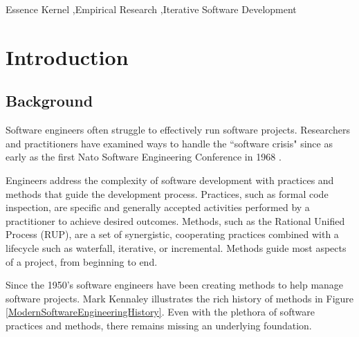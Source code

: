 \documentclass[preprint,12pt,3p]{elsarticle}
\begin{document}
\begin{frontmatter}
\begin{abstract}

\end{abstract}

\begin{keyword}
Essence Kernel \sep Empirical Research \sep Iterative Software Development
\end{keyword}

\end{frontmatter}


\section{Introduction}

\subsection{Background}
Software engineers often struggle to effectively run software projects. Researchers and practitioners have examined ways to handle the ``software crisis" since as early as the first Nato Software Engineering Conference in 1968 \cite{Naur1969}. 

Engineers address the complexity of software development with practices and methods that guide the development process. Practices, such as formal code inspection, are specific and generally accepted activities performed by a practitioner to achieve desired outcomes. Methods, such as the Rational Unified Process (RUP), are a set of synergistic, cooperating practices combined with a lifecycle such as waterfall, iterative, or incremental. Methods guide most aspects of a project, from beginning to end.

Since the 1950's software engineers have been creating methods to help manage software projects. Mark Kennaley illustrates the rich history of methods \cite{SDLC, ValueStream} in Figure \ref{ModernSoftwareEngineeringHistory}. Even with the plethora of software practices and methods, there remains missing an underlying foundation.
\end{document}
